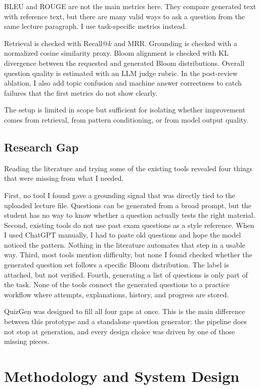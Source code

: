 \documentclass[12pt,a4paper]{article}
\begin{document}
BLEU and ROUGE are not the main metrics here. They compare generated text
with reference text, but there are many valid ways to ask a question from
the same lecture paragraph. I use task-specific metrics instead.

Retrieval is checked with Recall@$k$ and MRR. Grounding is checked with a
normalized cosine similarity proxy. Bloom alignment is checked with KL
divergence between the requested and generated Bloom distributions. Overall
question quality is estimated with an LLM judge rubric. In the post-review
ablation, I also add topic confusion and machine answer correctness to catch
failures that the first metrics do not show clearly.

The setup is limited in scope but sufficient for isolating whether
improvement comes from retrieval, from pattern conditioning, or from
model output quality.

\subsection{Research Gap}

Reading the literature and trying some of the existing tools revealed four
things that were missing from what I needed.

First, no tool I found gave a grounding signal that was directly tied to the
uploaded lecture file. Questions can be generated from a broad prompt, but
the student has no way to know whether a question actually tests the right
material. Second, existing tools do not use past exam questions as a style
reference. When I used ChatGPT manually, I had to paste old questions and
hope the model noticed the pattern. Nothing in the literature automates
that step in a usable way. Third, most tools mention difficulty, but none I
found checked whether the generated question set follows a specific Bloom
distribution. The label is attached, but not verified. Fourth, generating a
list of questions is only part of the task. None of the tools connect the
generated questions to a practice workflow where attempts, explanations,
history, and progress are stored.

QuizGen was designed to fill all four gaps at once. This is the main
difference between this prototype and a standalone question generator: the
pipeline does not stop at generation, and every design choice was driven by
one of those missing pieces.

\clearpage
\section{Methodology and System Design}
\end{document}
